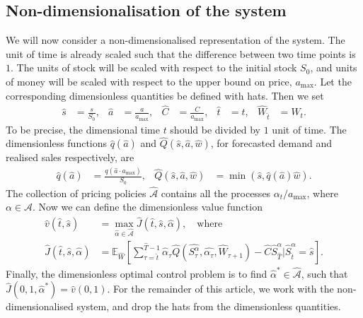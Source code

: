 \documentclass{rsproca_new}
\theoremstyle{definition}
\begin{document}
\subsection{Non-dimensionalisation of the system}
We will now consider a non-dimensionalised
representation of the system.
The unit of time is already scaled such that
the difference between two time points is $1$.
The units of stock will be  scaled with
respect to
the initial stock $S_0$, and units of money will be scaled with respect to
the upper bound on
price, $a_{\mathrm{max}}$.
Let the corresponding dimensionless quantities be defined with hats.
Then we set
\begin{align}
  \hat s
  &= \frac{s}{S_0},
  &\hat a
  &=\frac{a}{a_{\mathrm{max}}},
  &\hat C&=\frac{C}{a_{\mathrm{max}}},
  &\hat t &= t,
  &\hat W_{\hat t}&=W_{t}.
\end{align}
To be precise, the dimensional time $t$ should be divided by $1$ unit of time.
The dimensionless functions $\hat q(\hat a)$ and $\hat Q(\hat s,\hat
a, \hat w)$,
for forecasted demand
and realised sales respectively, are
\begin{align}
  \hat q(\hat a)&= \frac{q(\hat a\cdot a_{\max})}{S_0},
  &\hat Q(\hat s,\hat a, \hat w)&= \min(\hat s, \hat q(\hat a)\hat w).
\end{align}
The collection of pricing policies $\hat{\mathcal A}$ contains all
the processes $\alpha_t/a_{\mathrm{max}}$, where $\alpha\in \mathcal
A$. Now we can define the dimensionless value function
\begin{align}\label{eq:value_function_def_nondim}
  \hat v(\hat t,\hat s)&=\max_{\hat \alpha\in\hat{\mathcal A}}
                         \hat J(\hat t,\hat s,\hat \alpha),\quad\text{where}\\
  \hat J(\hat t,\hat s,\hat \alpha)&=
                                     \mathbb E_{\hat W}\left[ \sum_{\tau=\hat t}^{\hat T-1}
                                     \hat \alpha_\tau\hat Q(\hat
                                     {S_\tau^\alpha},\hat{\alpha_\tau},\hat
                                     W_{\tau+1})
                                     - \hat C \hat{S}_{\hat{T}}^\alpha \big\vert \hat{S}_{\hat{t}}^\alpha =
                                     \hat s
                                     \right].
                                     \label{eq:value_function_def_nondim2}
\end{align}
Finally, the dimensionless optimal control problem
is to find $\hat \alpha^*\in\hat{\mathcal A}$, such that
$\hat J(0,1,\hat \alpha^*)=\hat v(0,1)$.
For the remainder of this article, we work with the
non-dimensionalised system, and drop the hats from the
dimensionless quantities.
\end{document}
